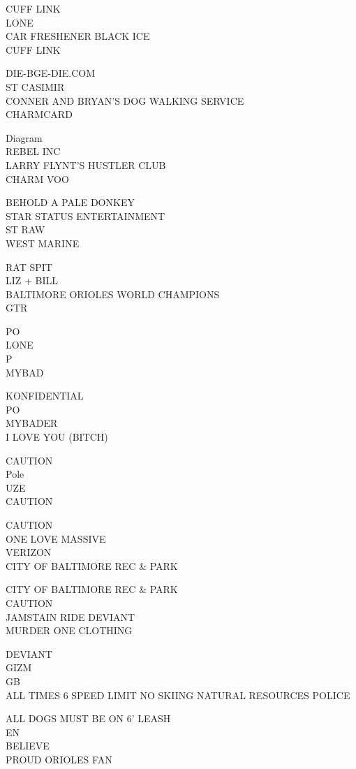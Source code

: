 \documentclass[10pt,letterpaper]{article}
\begin{document}
CUFF LINK\\
LONE\\
CAR FRESHENER BLACK ICE\\
CUFF LINK

DIE{-}BGE{-}DIE.COM\\
ST CASIMIR\\
CONNER AND BRYAN'S DOG WALKING SERVICE\\
CHARMCARD

Diagram\\
REBEL INC\\
LARRY FLYNT'S HUSTLER CLUB\\
CHARM VOO

BEHOLD A PALE DONKEY\\
STAR STATUS ENTERTAINMENT\\
ST RAW\\
WEST MARINE

RAT SPIT\\
LIZ + BILL\\
BALTIMORE ORIOLES WORLD CHAMPIONS\\
GTR

PO\\
LONE\\
P\\
MYBAD

KONFIDENTIAL\\
PO\\
MYBADER\\
I LOVE YOU (BITCH)

CAUTION\\
Pole\\
UZE\\
CAUTION

CAUTION\\
ONE LOVE MASSIVE\\
VERIZON\\
CITY OF BALTIMORE REC \& PARK

CITY OF BALTIMORE REC \& PARK\\
CAUTION\\
JAMSTAIN RIDE DEVIANT\\
MURDER ONE CLOTHING

DEVIANT\\
GIZM\\
GB\\
ALL TIMES 6 SPEED LIMIT NO SKIING NATURAL RESOURCES POLICE

ALL DOGS MUST BE ON 6' LEASH\\
EN\\
BELIEVE\\
PROUD ORIOLES FAN
\end{document}
